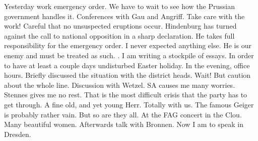 Yesterday work  emergency order. We have to wait to see how the Prussian government handles it. Conferences with Gau and Angriff. Take care with the work! Careful that no unsuspected eruptions occur. Hindenburg has turned against the call to national opposition in a sharp declaration. He takes full responsibility for the emergency order. I never expected anything else. He is our enemy and must be treated as such. . I am writing a stockpile of essays. In order to have at least a couple days undisturbed Easter holiday. In the evening, office hours. Briefly discussed the situation with the district heads. Wait! But caution about the whole line. Discussion with Wetzel. SA causes me many worries. Stennes gives me no rest. That is the most difficult crisis that the party has to get through. A fine old, and yet young Herr. Totally with us. The famous Geiger is probably rather vain. But so are they all. At the FAG concert in the Clou. Many beautiful women. Afterwards talk with Bronnen. Now I am to speak in Dresden. 
